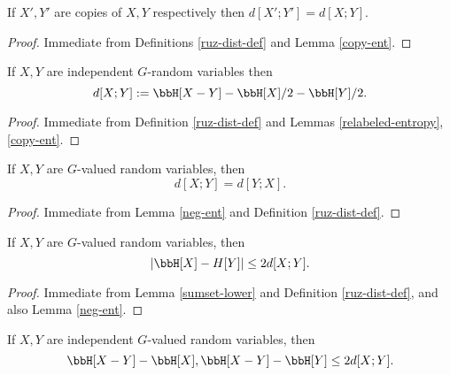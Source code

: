 \begin{lemma}\label{ruz-copy}
  \leanok
  If $X',Y'$ are copies of $X,Y$ respectively then $d[X';Y']=d[X;Y]$.
\end{lemma}

\begin{proof} \leanok Immediate from Definitions \ref{ruz-dist-def} and Lemma \ref{copy-ent}.
\end{proof}

\begin{lemma}\label{ruz-indep}
  \leanok
  If $X,Y$ are independent $G$-random variables then
  $$ d[X;Y] := \bbH[X - Y] - \bbH[X]/2 - \bbH[Y]/2.$$
\end{lemma}

\begin{proof} \leanok Immediate from Definition \ref{ruz-dist-def} and Lemmas \ref{relabeled-entropy}, \ref{copy-ent}.
\end{proof}

\begin{lemma}\label{ruzsa-symm}
  \leanok
  If $X,Y$ are $G$-valued random variables, then
  $$ d[X;Y] = d[Y;X].$$
\end{lemma}

\begin{proof} \leanok Immediate from Lemma \ref{neg-ent} and Definition \ref{ruz-dist-def}.
\end{proof}

\begin{lemma}\label{ruzsa-diff}
  \leanok
  If $X,Y$ are $G$-valued random variables, then
$$|\bbH[X]-H[Y]| \leq 2 d[X;Y].$$
\end{lemma}

\begin{proof}  \leanok Immediate from Lemma \ref{sumset-lower} and Definition \ref{ruz-dist-def}, and also Lemma \ref{neg-ent}.
\end{proof}

\begin{lemma}\label{ruzsa-growth}
  \leanok
  If $X,Y$ are independent $G$-valued random variables, then
$$  \bbH[X-Y] - \bbH[X], \bbH[X-Y] - \bbH[Y] \leq 2d[X;Y].$$
\end{lemma}

